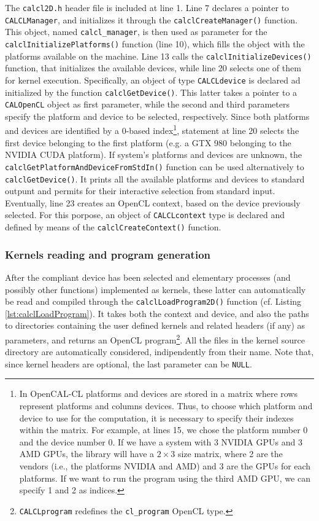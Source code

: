 The \verb'calcl2D.h' header file is included at line 1. Line 7
declares a pointer to \verb'CALCLManager', and initializes it through
the \verb'calclCreateManager()' function. This object, named
\verb'calcl_manager', is then used as parameter for the
\verb'calclInitializePlatforms()' function (line 10), which fills the
object with the platforms available on the machine. Line 13 calls the
\verb'calclInitializeDevices()' function, that initializes the
available devices, while line 20 selects one of them for kernel
execution. Specifically, an object of type \verb'CALCLdevice' is
declared ad initialized by the function \verb'calclGetDevice()'. This
latter takes a pointer to a \verb'CALOpenCL' object as first
parameter, while the second and third parameters specify the platform
and device to be selected, respectively. Since both platforms and
devices are identified by a 0-based index\footnote{In OpenCAL-CL
  platforms and devices are stored in a matrix where rows represent
  platforms and columns devices. Thus, to choose which platform and
  device to use for the computation, it is necessary to specify their
  indexes within the matrix. For example, at lines 15, we chose the
  platform number 0 and the device number 0. If we have a system with
  3 NVIDIA GPUs and 3 AMD GPUs, the library will have a $2 \times 3$
  size matrix, where 2 are the vendors (i.e., the platforms NVIDIA and
  AMD) and 3 are the GPUs for each platforms. If we want to run the
  program using the third AMD GPU, we can specify 1 and 2 as
  indices.}, statement at line 20 selects the first device belonging
to the first platform (e.g. a GTX 980 belonging to the NVIDIA CUDA
platform). If system's platforms and devices are unknown, the
\verb'calclGetPlatformAndDeviceFromStdIn()' function can be used
alternatively to \verb'calclGetDevice()'. It prints all the available
platforms and devices to standard outpunt and permits for their
interactive selection from standard input. Eventually, line 23 creates
an OpenCL context, based on the device previously selected. For this
porpose, an object of \verb'CALCLcontext' type is declared and defined
by means of the \verb'calclCreateContext()' function.

\subsubsection{Kernels reading and program generation}

After the compliant device has been selected and elementary processes
(and possibly other functions) implemented as kernels, these latter
can automatically be read and compiled through the
\verb'calclLoadProgram2D()' function (cf. Listing
\ref{lst:calclLoadProgram}). It takes both the context and device, and
also the paths to directories containing the user defined kernels and
related headers (if any) as parameters, and returns an OpenCL
program\footnote{\texttt{CALCLprogram} redefines the
  \texttt{cl\_program} OpenCL type.}. All the files in the kernel
source directory are automatically considered, indipendently from
their name. Note that, since kernel headers are optional, the last
parameter can be \verb'NULL'.

